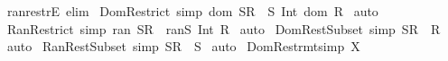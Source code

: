 \begin{isabellebody}
\isamarkupfalse%
%
\endisatagproof
{\isafoldproof}%
%
\isadelimproof
\isanewline
%
\endisadelimproof
{}\isamarkupfalse%
\ ran{\isacharunderscore}restrE\ {\isacharbrackleft}elim{\isacharbang}{\isacharbrackright}\isanewline
\isanewline
\isanewline
{}\isamarkupfalse%
\ Dom{\isacharunderscore}Restrict\ {\isacharbrackleft}simp{\isacharbrackright}{\isacharcolon}\ {\isachardoublequoteopen}dom\ {\isacharparenleft}S{\isacharless}{\isacharcolon}R{\isacharparenright}\ {\isacharequal}\ S\ Int\ {\isacharparenleft}dom\ R{\isacharparenright}{\isachardoublequoteclose}\isanewline
%
\isadelimproof
%
\endisadelimproof
%
\isatagproof
{}\isamarkupfalse%
\ auto\isanewline
{}\isamarkupfalse%
%
\endisatagproof
{\isafoldproof}%
%
\isadelimproof
\isanewline
%
\endisadelimproof
\isanewline
{}\isamarkupfalse%
\ Ran{\isacharunderscore}Restrict\ {\isacharbrackleft}simp{\isacharbrackright}{\isacharcolon}\ {\isachardoublequoteopen}ran\ {\isacharparenleft}S{\isacharcolon}{\isachargreater}R{\isacharparenright}\ {\isacharequal}\ ran{\isacharparenleft}S{\isacharparenright}\ Int\ R{\isachardoublequoteclose}\isanewline
%
\isadelimproof
%
\endisadelimproof
%
\isatagproof
{}\isamarkupfalse%
\ auto\isanewline
{}\isamarkupfalse%
%
\endisatagproof
{\isafoldproof}%
%
\isadelimproof
\isanewline
%
\endisadelimproof
\isanewline
{}\isamarkupfalse%
\ Dom{\isacharunderscore}Rest{\isacharunderscore}Subset\ {\isacharbrackleft}simp{\isacharbrackright}{\isacharcolon}\ {\isachardoublequoteopen}{\isacharparenleft}S{\isacharless}{\isacharcolon}R{\isacharparenright}\ {\isacharless}{\isacharequal}\ R{\isachardoublequoteclose}\isanewline
%
\isadelimproof
%
\endisadelimproof
%
\isatagproof
{}\isamarkupfalse%
\ auto\isanewline
{}\isamarkupfalse%
%
\endisatagproof
{\isafoldproof}%
%
\isadelimproof
\isanewline
%
\endisadelimproof
\isanewline
{}\isamarkupfalse%
\ Ran{\isacharunderscore}Rest{\isacharunderscore}Subset\ {\isacharbrackleft}simp{\isacharbrackright}{\isacharcolon}\ {\isachardoublequoteopen}{\isacharparenleft}S{\isacharcolon}{\isachargreater}R{\isacharparenright}\ {\isacharless}{\isacharequal}\ S{\isachardoublequoteclose}\isanewline
%
\isadelimproof
%
\endisadelimproof
%
\isatagproof
{}\isamarkupfalse%
\ auto\isanewline
{}\isamarkupfalse%
%
\endisatagproof
{\isafoldproof}%
%
\isadelimproof
\isanewline
%
\endisadelimproof
\isanewline
{}\isamarkupfalse%
\ Dom{\isacharunderscore}Restr{\isacharunderscore}mt{\isacharbrackleft}simp{\isacharbrackright}{\isacharcolon}\ {\isachardoublequoteopen}X\ {\isacharless}{\isacharcolon}\ {\isacharbraceleft}{\isacharbraceright}\ {\isacharequal}\ {\isacharbraceleft}{\isacharbraceright}{\isachardoublequoteclose}\isanewline

\end{isabellebody}
